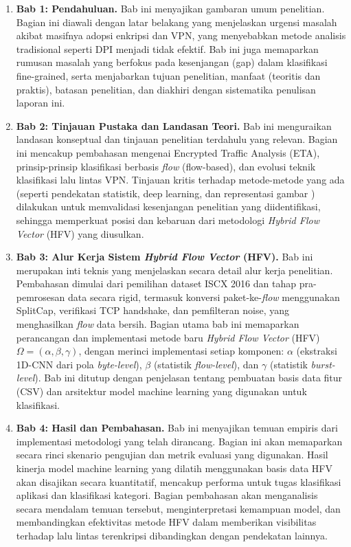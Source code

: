 \begin{enumerate}
    \item \textbf{Bab 1: Pendahuluan.} 
    Bab ini menyajikan gambaran umum penelitian. Bagian ini diawali dengan latar belakang yang menjelaskan urgensi masalah akibat masifnya adopsi enkripsi dan VPN, yang menyebabkan metode analisis tradisional seperti DPI menjadi tidak efektif. Bab ini juga memaparkan rumusan masalah yang berfokus pada kesenjangan (gap) dalam klasifikasi fine-grained, serta menjabarkan tujuan penelitian, manfaat (teoritis dan praktis), batasan penelitian, dan diakhiri dengan sistematika penulisan laporan ini.
    
    \item \textbf{Bab 2: Tinjauan Pustaka dan Landasan Teori.} 
    Bab ini menguraikan landasan konseptual dan tinjauan penelitian terdahulu yang relevan. Bagian ini mencakup pembahasan mengenai Encrypted Traffic Analysis (ETA), prinsip-prinsip klasifikasi berbasis \textit{flow} (flow-based), dan evolusi teknik klasifikasi lalu lintas VPN. Tinjauan kritis terhadap metode-metode yang ada (seperti pendekatan statistik, deep learning, dan representasi gambar ) dilakukan untuk memvalidasi kesenjangan penelitian yang diidentifikasi, sehingga memperkuat posisi dan kebaruan dari metodologi \textit{Hybrid Flow Vector} (HFV) yang diusulkan.
    
    \item \textbf{Bab 3: Alur Kerja Sistem \textit{Hybrid Flow Vector} (HFV).} 
    Bab ini merupakan inti teknis yang menjelaskan secara detail alur kerja penelitian. Pembahasan dimulai dari pemilihan dataset ISCX 2016 dan tahap pra-pemrosesan data secara rigid, termasuk konversi paket-ke-\textit{flow} menggunakan SplitCap, verifikasi TCP handshake, dan pemfilteran noise, yang menghasilkan \textit{flow} data bersih. Bagian utama bab ini memaparkan perancangan dan implementasi metode baru \textit{Hybrid Flow Vector} (HFV) $\Omega=(\alpha,\beta,\gamma)$, dengan merinci implementasi setiap komponen: $\alpha$ (ekstraksi 1D-CNN dari pola \textit{byte-level}), $\beta$ (statistik \textit{flow-level}), dan $\gamma$ (statistik \textit{burst-level}). Bab ini ditutup dengan penjelasan tentang pembuatan basis data fitur (CSV) dan arsitektur model machine learning yang digunakan untuk klasifikasi.
    
    \item \textbf{Bab 4: Hasil dan Pembahasan.} 
    Bab ini menyajikan temuan empiris dari implementasi metodologi yang telah dirancang. Bagian ini akan memaparkan secara rinci skenario pengujian dan metrik evaluasi yang digunakan. Hasil kinerja model machine learning yang dilatih menggunakan basis data HFV  akan disajikan secara kuantitatif, mencakup performa untuk tugas klasifikasi aplikasi dan klasifikasi kategori. Bagian pembahasan akan menganalisis secara mendalam temuan tersebut, menginterpretasi kemampuan model, dan membandingkan efektivitas metode HFV dalam memberikan visibilitas terhadap lalu lintas terenkripsi dibandingkan dengan pendekatan lainnya.
    

\end{enumerate}

